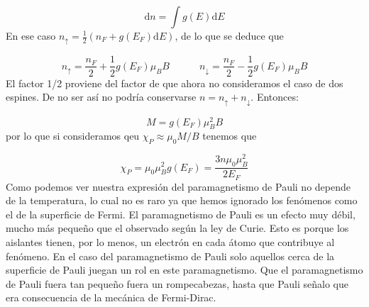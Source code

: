 \documentclass[12pt,a4paper]{book}
\numberwithin{equation}{section}
\numberwithin{figure}{section}
\newcommand{\tquad}{\quad \quad \quad}
\newcommand{\parentesis}[1]{\left( #1  \right)}
\newcommand{\D}{\mathrm{d}}
\begin{document}
\begin{equation}
   \D n = \int g(E) \D E
\end{equation}
En ese caso $n_\uparrow =\frac{1}{2} \parentesis{n_{F} +  g(E_F) \D E}$, de lo que se deduce que

\begin{equation}
    n_\uparrow =  \frac{n_{F}}{2}+ \frac{1}{2} g(E_F) \mu_B B \tquad n_\downarrow = \frac{n_{F}}{2}- \frac{1}{2} g(E_F) \mu_B B
\end{equation}
El factor 1/2 proviene del factor de que ahora no consideramos el caso de dos espines. De no ser así no podría conservarse $n=n_\uparrow + n_\downarrow$. Entonces:

\begin{equation}
    M = g(E_F) \mu_B^2 B
\end{equation}
por lo que si consideramos qeu $\chi_P \approx \mu_0 M /B$ tenemos que

\begin{equation}
    \chi_P = \mu_0 \mu_B^2 g(E_F) = \frac{3 n \mu_0 \mu_B^2}{2 E_F}
\end{equation}
Como podemos ver nuestra expresión del paramagnetismo de Pauli no depende de la temperatura, lo cual no es raro ya que hemos ignorado los fenómenos como el de la superficie de Fermi. El paramagnetismo de Pauli es un efecto muy débil, mucho más pequeño que el observado según la ley de Curie. Esto es porque los aislantes tienen, por lo menos, un electrón en cada átomo que contribuye al fenómeno. En el caso del paramagnetismo de Pauli solo aquellos cerca de la superficie de Pauli juegan un rol en este paramagnetismo. Que el paramagnetismo de Pauli fuera tan pequeño fuera un rompecabezas, hasta que Pauli señalo que era consecuencia de la mecánica de Fermi-Dirac. \\




\end{document}
